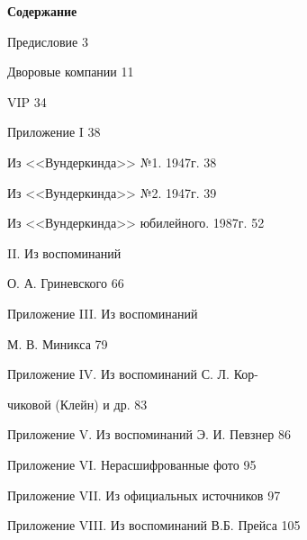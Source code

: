 \documentclass[utf8x, 12pt, twoside, a5paper]{G7-32} %
\begin{document}
\begin{center}

    \textbf{\Large Содержание}

    \indent

    Предисловие \hfill 3
    
    Дворовые компании \hfill 11
    
    VIP \hfill 34
    
    Приложение I \hfill 38
    
    \hspace{20pt} Из <<Вундеркинда>> №1. 1947г. \hfill 38
    
    \hspace{20pt} Из <<Вундеркинда>> №2. 1947г. \hfill 39
    
    \hspace{20pt} Из <<Вундеркинда>> юбилейного. 1987г. \hfill 52
    
    
    { II. Из воспоминаний 
    
    }
    
    \hspace{93pt}О. А. Гриневского \hfill 66
    
    {\raggedright Приложение III. Из воспоминаний
    
    } 
    \hspace{93pt}М. В. Миникса \hfill 79
   
    {\raggedright Приложение IV. Из воспоминаний С. Л. Кор-
    
    }
    
    \hspace{93pt}чиковой (Клейн) и др. \hfill 83
    
    Приложение V. Из воспоминаний Э. И. Певзнер \hfill 86
    
    Приложение VI. Нерасшифрованные фото \hfill 95    
    
    Приложение VII. Из официальных источников \hfill 97
    
    Приложение VIII. Из воспоминаний В.Б. Прейса \hfill 105
    
\end{center}
\end{document}
